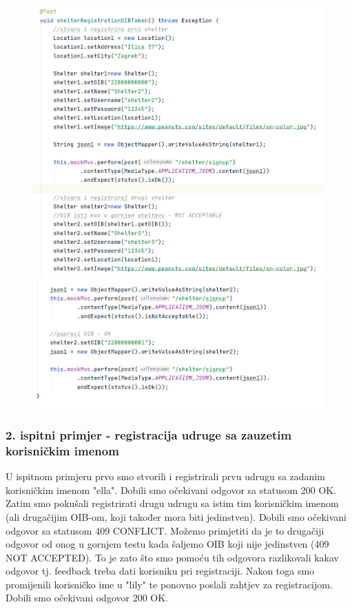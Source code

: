 			
			\begin{figure}[H]
				\centerline{
					\includegraphics[scale=0.73]{slike/shelter1.1.PNG}}
				\hspace*{-0.21in}
				\includegraphics[scale=0.73]{slike/shelter1.2.PNG}
				\centering
			\end{figure}
			
			
			
			\subsubsection{2. ispitni primjer - registracija udruge sa zauzetim korisničkim imenom}
			
			U ispitnom primjeru prvo smo stvorili i registrirali prvu udrugu sa zadanim korisničkim imenom "ella". Dobili smo očekivani odgovor sa statusom 200 OK. Zatim smo pokušali registrirati drugu udrugu sa istim tim korisničkim imenom (ali drugačijim OIB-om, koji također mora biti jedinstven). Dobili smo očekivani odgovor sa statusom 409 CONFLICT. Možemo primjetiti da je to drugačiji odgovor od onog u gornjem testu kada šaljemo OIB koji nije jedinstven (409 NOT ACCEPTED). To je zato što smo pomoću tih odgovora razlikovali kakav odgovor tj. feedback treba dati korisniku pri registraciji. Nakon toga smo promijenili korisničko ime u "lily" te ponovno poslali zahtjev za registracijom. Dobili smo očekivani odgovor 200 OK.
			
